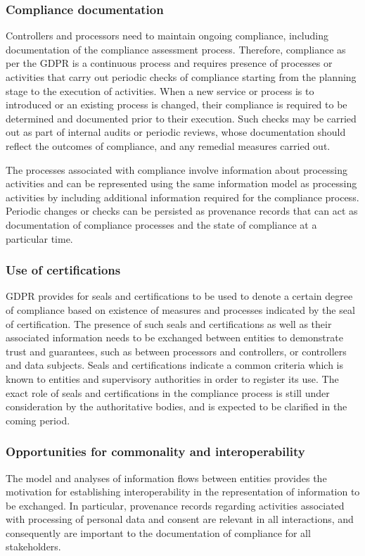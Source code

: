 \subsubsection{Compliance documentation}
Controllers and processors need to maintain ongoing compliance, including documentation of the compliance assessment process. Therefore, compliance as per the GDPR is a continuous process and requires presence of processes or activities that carry out periodic checks of compliance starting from the planning stage to the execution of activities.
When a new service or process is to introduced or an existing process is changed, their compliance is required to be determined and documented prior to their execution.
Such checks may be carried out as part of internal audits or periodic reviews, whose documentation should reflect the outcomes of compliance, and any remedial measures carried out.

The processes associated with compliance involve information about processing activities and can be represented using the same information model as processing activities by including additional information required for the compliance process. Periodic changes or checks can be persisted as provenance records that can act as documentation of compliance processes and the state of compliance at a particular time.

\subsubsection{Use of certifications}
GDPR provides for seals and certifications to be used to denote a certain degree of compliance based on existence of measures and processes indicated by the seal of certification. The presence of such seals and certifications as well as their associated information needs to be exchanged between entities to demonstrate trust and guarantees, such as between processors and controllers, or controllers and data subjects. Seals and certifications indicate a common criteria which is known to entities and supervisory authorities in order to register its use. The exact role of seals and certifications in the compliance process is still under consideration by the authoritative bodies, and is expected to be clarified in the coming period.

\subsubsection{Opportunities for commonality and interoperability}
The model and analyses of information flows between entities provides the motivation for establishing interoperability in the representation of information to be exchanged.
In particular, provenance records regarding activities associated with processing of personal data and consent are relevant in all interactions, and consequently are important to the documentation of compliance for all stakeholders. 

